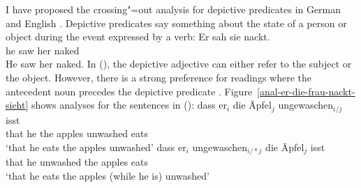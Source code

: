 I have proposed the crossing"=out analysis for depictive predicates in German and English 
\citep{Mueller2004c,Mueller2008a}. Depictive predicates say something about the state of a person or object during the event
expressed by a verb:
\eal
\ex 
\gll Er sah sie nackt.\footnotemark\\
	 he saw her naked\\
\ex He saw her naked.
\zl
In (), the depictive adjective can either refer to the subject or the object. However, there is a strong preference for readings where
the antecedent noun precedes the depictive predicate
\citep[]{Loetscher85a}. Figure~\vref{anal-er-die-frau-nackt-sieht} shows analyses for the
sentences in ():
\eal
\ex 
\gll dass er$_i$ die Äpfel$_j$ ungewaschen$_{i/j}$ isst\\
	 that he the apples unwashed eats\\
\glt `that he eats the apples unwashed'
\ex 
\gll dass er$_i$ ungewaschen$_{i/*j}$ die Äpfel$_j$ isst\\
	 that he unwashed the apples eats\\
\glt `that he eats the apples (while he is) unwashed'
\zl
